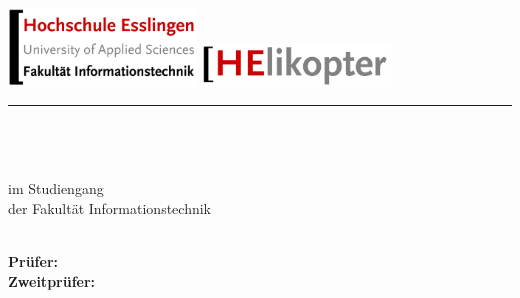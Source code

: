 \newcommand{\HRule}[2]{\noindent\rule[#1]{\linewidth}{#2}} %
\newcommand{\vlinespace}[1]{\vspace*{#1\baselineskip}} %
\newcommand{\titleemph}[1]{\textbf{#1}} %

\begin{titlepage}
 \sffamily %
      \includegraphics[width=5cm]{fig/aa-titel/HE_IT_Logo}\hfill    
      \includegraphics[width=5cm]{fig/aa-titel/HElikopter_Logo}
      \HRule{13pt}{2pt} 
   \centering
      \Large
      \vlinespace{3}\\
      \workTyp\\
      \huge
      \workTitel\\
%
      \Large
      \vlinespace{2}
          im Studiengang \workStudiengang\\
          der Fakultät Informationstechnik\\
%      
      \workSemester\\
%     
      \vlinespace{2}
      \workNameStudent
%
   \vfill
   \raggedright
%   
   \large
   \titleemph{Prüfer:} \workPruefer \\
   \titleemph{Zweitprüfer:} \workZweitPruefer \\ %

%
\end{titlepage}
